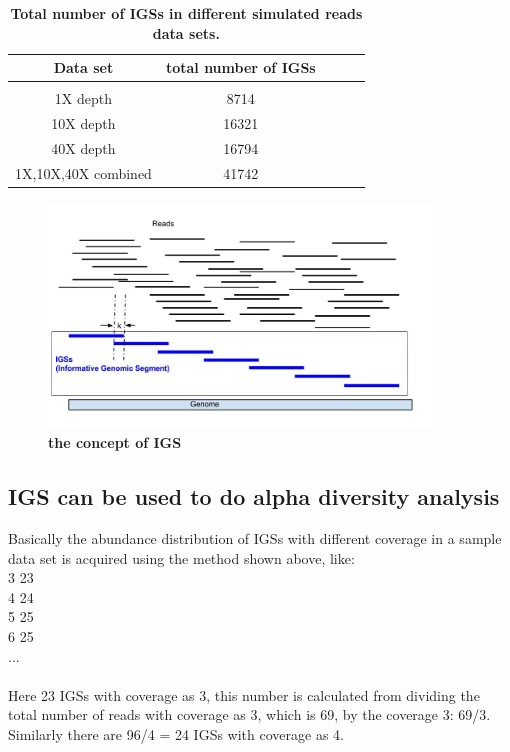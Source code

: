 \begin{table}[!ht]
\caption{
\bf{Total number of IGSs in different simulated reads data sets.}
}
\begin{tabular}{ |c | c |c| c|c| }
Data set & total number of IGSs \\
\hline \\
1X depth                   & 8714  \\
10X depth                  & 16321  \\
40X depth                  & 16794 \\
1X,10X,40X combined        & 41742 \\
\end{tabular}
\begin{flushleft}
\end{flushleft}
\label{table:IGSs}
\end{table}


\begin{figure}[!ht]
\centerline{\includegraphics[width=4in]{./figures/IGSs_figure.jpg}}
\caption{\bf the concept of IGS}
\label{fig:IGS}
\end{figure}





\subsection{IGS can be used to do alpha diversity analysis}

Basically the abundance distribution of IGSs with different coverage in a sample data set is acquired using the method shown above, like:
\\
3 23\\
4 24\\
5 25\\
6 25\\
...\\
\\
Here 23 IGSs with coverage as 3, this number is calculated from dividing the total number of reads with coverage as 3, which is 69, by the coverage 3: 69/3. Similarly there are 96/4 = 24 IGSs with coverage as 4.

